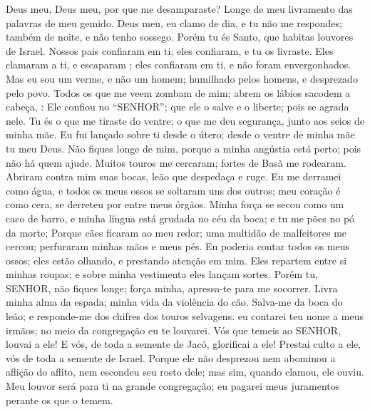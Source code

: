 {\PP 
  Deus meu, Deus meu, por que me desamparaste? Longe
{} de meu livramento
{} das palavras de meu gemido.
  Deus meu, eu clamo de dia, e tu não me respondes; também
{} de noite, e não tenho sossego.
  Porém tu és Santo, que habitas
{} louvores de Israel.
  Nossos pais confiaram em ti; eles confiaram, e tu os livraste.
  Eles clamaram a ti, e escaparam
{} ; eles confiaram em ti, e não foram envergonhados.
  Mas eu sou um verme, e não um homem;
{} humilhado pelos homens, e desprezado pelo povo.
  Todos os que me veem zombam de mim; abrem os lábios
{} sacodem a cabeça,
{} :
  Ele confiou no “SENHOR”;
{} que ele o salve e o liberte; pois se agrada nele.
  Tu és o que me tiraste do ventre;
{} o que me deu segurança,
{} junto aos seios de minha mãe.
  Eu fui lançado sobre ti desde
{} o útero; desde o ventre de minha mãe tu
{} meu Deus.
  Não fiques longe de mim, porque a minha angústia está perto; pois não há quem
{} ajude.
  Muitos touros me cercaram; fortes de Basã me rodearam.
  Abriram contra mim suas bocas,
{} leão que despedaça e ruge.
  Eu me derramei como água, e todos os meus ossos se soltaram uns dos outros; meu coração é como cera,
{} se derreteu por entre meus órgãos.
  Minha força se secou como um caco de barro, e minha língua está grudada no céu da boca; e tu me pões no pó da morte;
  Porque cães ficaram ao meu redor; uma multidão de malfeitores me cercou; perfuraram minhas mãos e meus pés.
  Eu poderia contar todos os meus ossos; eles estão
{} olhando, e prestando atenção em mim.
  Eles repartem entre si minhas roupas; e sobre minha vestimenta eles lançam sortes.
  Porém tu, SENHOR, não fiques longe; força minha, apressa-te para me socorrer.
  Livra minha alma da espada;
{} minha vida da violência do cão.
  Salva-me da boca do leão; e responde-me dos chifres dos touros selvagens.
   eu contarei teu nome a meus irmãos; no meio da congregação eu te louvarei.
  Vós que temeis ao SENHOR, louvai a ele! E vós, de toda a semente de Jacó, glorificai a ele! Prestai culto a ele, vós de toda a semente de Israel.
  Porque ele não desprezou nem abominou a aflição do aflito, nem escondeu seu rosto dele; mas sim, quando
{} clamou, ele
{} ouviu.
  Meu louvor será para ti na grande congregação; eu pagarei meus juramentos perante os que o temem.
}
